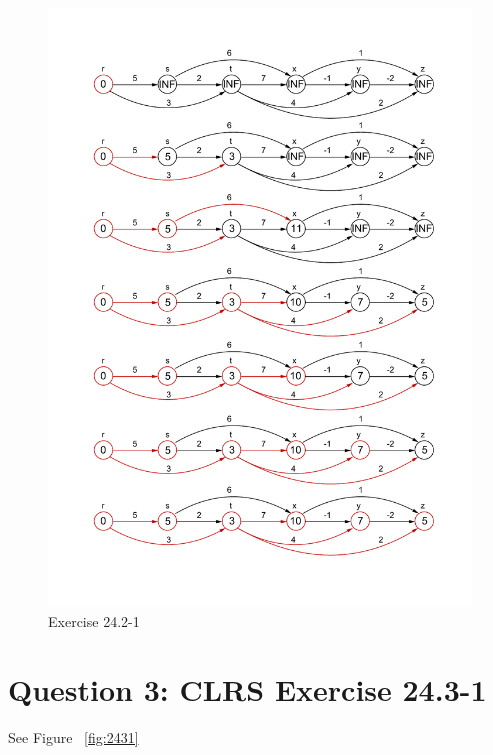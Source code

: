 \documentclass[]{article}
\begin{document}
\begin{figure}
	\centering
	\includegraphics[width=\linewidth]{2421}
	\caption{Exercise 24.2-1}
	\label{fig:2421}
\end{figure}

\section{Question 3: CLRS Exercise 24.3-1}

See Figure ~\ref{fig:2431}
\end{document}
